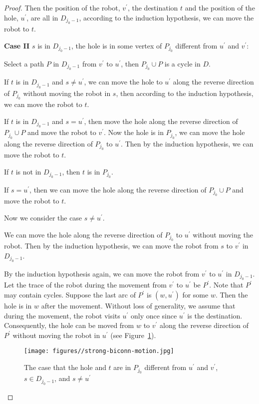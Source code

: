 \documentclass{article}
\begin{document}
\begin{proof}
Then the position of the robot, $v^\prime$, the destination $t$ and
the position of the hole, $u^\prime$, are all in $D_{j_0-1}$,
according to the induction hypothesis, we can move the robot to $t$.

\textbf{Case II} $s$ is in $D_{j_0-1}$, the hole is in some vertex
of $P_{j_0}$ different from $u^\prime$ and $v^\prime$:

Select a path $P$ in $D_{j_0-1}$ from $v^\prime$ to $u^\prime$, then
$P_{j_0} \cup P$ is a cycle in $D$.

If $t$ is in $D_{j_0-1}$ and $s \neq u^\prime$, we can move the hole
to $u^\prime$ along the reverse direction of $P_{j_0}$ without
moving the robot in $s$, then according to the induction hypothesis,
we can move the robot to $t$.

If $t$ is in $D_{j_0-1}$ and $s = u^\prime$, then move the hole
along the reverse direction of $P_{j_0} \cup P$ and move the robot
to $v^\prime$. Now the hole is in $P_{j_0}$, we can move the hole
along the reverse direction of $P_{j_0}$ to $u^\prime$. Then by the
induction hypothesis, we can move the robot to $t$.

If $t$ is not in $D_{j_0-1}$, then $t$ is in $P_{j_0}$.

If $s = u^\prime$, then we can move the hole along the reverse
direction of $P_{j_0} \cup P$ and move the robot to $t$.

Now we consider the case $s \neq u^\prime$.

We can move the hole along the reverse direction of $P_{j_0}$ to
$u^\prime$ without moving the robot. Then by the induction
hypothesis, we can move the robot from $s$ to $v^\prime$ in
$D_{j_0-1}$.

By the induction hypothesis again, we can move the robot from
$v^\prime$ to $u^\prime$ in $D_{j_0-1}$. Let the trace of the robot
during the movement from $v^\prime$ to $u^\prime$ be $P^\prime$.
Note that $P^\prime$ may contain cycles. Suppose the last arc of
$P^\prime$ is $(w,u^\prime)$ for some $w$. Then the hole is in $w$
after the movement. Without loss of generality, we assume that
during the movement, the robot visits $u^\prime$ only once since
$u^\prime$ is the destination. Consequently, the hole can be moved
from $w$ to $v^\prime$ along the reverse direction of $P^\prime$
without moving the robot in $u^\prime$ (see
Figure~\ref{fig:strong-biconn-motion}).

\begin{figure}[ht]
\centering
  \texttt{[image: figures//strong-biconn-motion.jpg]}
  \caption{The case that the hole and $t$ are in $P_{j_0}$ different from $u^\prime$ and $v^\prime$, $s \in D_{j_0-1}$, and $s \neq u^\prime$}\label{fig:strong-biconn-motion}
\end{figure}


\end{proof}
\end{document}
